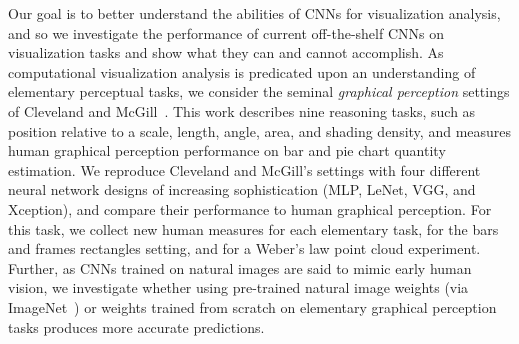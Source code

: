 Our goal is to better understand the abilities of CNNs for visualization analysis, and so we investigate the performance of current off-the-shelf CNNs on visualization tasks and show what they can and cannot accomplish. As computational visualization analysis is predicated upon an understanding of elementary perceptual tasks, we consider the seminal \emph{graphical perception} settings of Cleveland and McGill~\cite{cleveland_mcgill}. This work describes nine reasoning tasks, such as position relative to a scale, length, angle, area, and shading density, and measures human graphical perception performance on bar and pie chart quantity estimation. We reproduce Cleveland and McGill's settings with four different neural network designs of increasing sophistication (MLP, LeNet, VGG, and Xception), and compare their performance to human graphical perception. For this task, we collect new human measures for each elementary task, for the bars and frames rectangles setting, and for a Weber's law point cloud experiment. Further, as CNNs trained on natural images are said to mimic early human vision, we investigate whether using pre-trained natural image weights (via ImageNet~\cite{imagenet}) or weights trained from scratch on elementary graphical perception tasks produces more accurate predictions.






